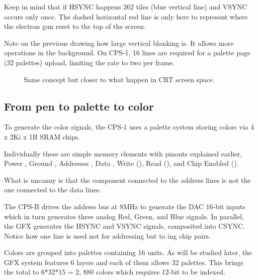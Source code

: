 
Keep in mind that if HSYNC happens 262 tiles (blue vertical line) and VSYNC occurs only once. The dashed horizontal red line is only here to represent where the electron gun reset to the top of the screen.

Note on the previous drawing how large vertical blanking is. It allows more operations in the background. On CPS-1, 16 lines are required for a palette page (32 palettes) upload, limiting the rate to two per frame.

\begin{figure}[H]
\caption*{Same concept but closer to what happen in CRT screen space.}
\end{figure}


\subsection{From pen to palette to color}

To generate the color signals, the CPS-1 uses a palette system storing colors via 4 x 2Ki x 1B  SRAM chips.


Individually these are simple memory elements with pinouts explained earlier, Power , Ground , Addresses , Data , Write (), Read (), and Chip Enabled ().

What is uncanny is that the component connected to the address lines is not the one connected to the data lines.







The CPS-B drives the address bus at 8MHz to generate the DAC 16-bit inputs which in turn generates three analog Red, Green, and Blue signals. In parallel, the GFX generates the HSYNC and VSYNC signals, composited into CSYNC.
Notice how one line is used not for addressing but to ing chip pairs. 


Colors are grouped into palettes containing 16 units. As will be studied later, the GFX system features 6 layers and each of them allows 32 palettes. This brings the total to 6*32*15 = 2, 880 colors which requires 12-bit to be indexed.


